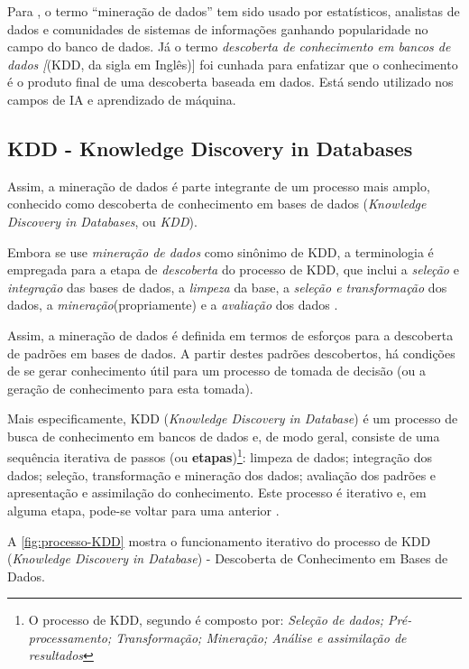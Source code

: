 Para , o termo ``mineração de dados'' tem sido usado  por estatísticos, analistas de dados e comunidades de sistemas de informações ganhando popularidade no campo do banco de dados. Já o termo \textit{descoberta de conhecimento em bancos de dados [}(KDD, da sigla em Inglês)] foi cunhada para enfatizar que o conhecimento é o produto final de uma descoberta baseada em dados. Está sendo utilizado nos campos de IA e aprendizado de máquina.


\subsection{KDD - Knowledge Discovery in Databases}
Assim, a mineração de dados é parte integrante de um processo mais amplo, conhecido como descoberta de conhecimento em bases de dados (\textit{Knowledge Discovery in Databases}, ou \textit{KDD})\cite{fayyad1996}. 

Embora se use \textit{mineração de dados} como sinônimo de KDD, a terminologia é empregada para a etapa de \textit{descoberta}  do processo de KDD, que inclui a \textit{seleção} e \textit{integração} das bases de dados, a \textit{limpeza} da base, a \textit{seleção e transformação} dos dados, a \textit{mineração}(propriamente) e a \textit{avaliação} dos dados \cite{ferrari2017}\cite{Boscarioli2017}.

Assim, a mineração de dados  é definida em termos de esforços para a descoberta de padrões em bases de dados. A partir destes padrões descobertos, há condições de se gerar conhecimento útil para um processo de tomada de decisão (ou a geração de conhecimento para esta tomada).

Mais especificamente, KDD (\textit{Knowledge Discovery in Database}) é um processo de busca de conhecimento em bancos de dados e, de modo geral, consiste de uma sequência iterativa de passos (ou \textbf{etapas})\footnote{O processo de KDD, segundo \cite{fayyad1996} é composto por: \textit{Seleção de dados; Pré-processamento; Transformação; Mineração; Análise e assimilação de resultados}}: limpeza de dados; integração dos dados; seleção, transformação e mineração dos dados; avaliação dos padrões e apresentação e assimilação do conhecimento. Este processo é iterativo e, em alguma etapa, pode-se voltar para uma anterior \cite{Boscarioli2017}.

A \autoref{fig:processo-KDD} mostra o funcionamento iterativo do processo de KDD (\textit{Knowledge Discovery in Database}) -  Descoberta de Conhecimento em Bases de Dados.

